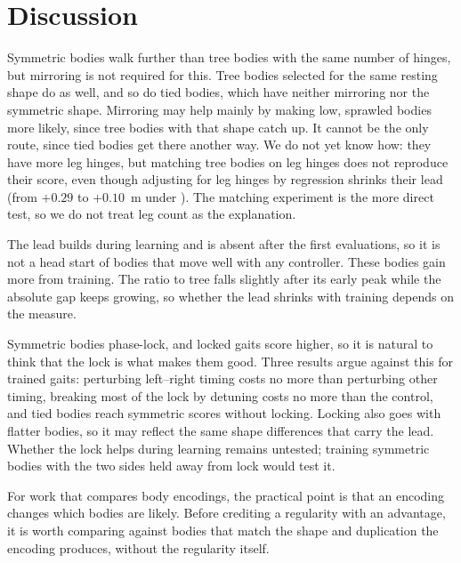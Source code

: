 \section{Discussion}
\label{sec:discussion}

Symmetric bodies walk further than tree bodies with the same number of hinges, but mirroring is not required for this. Tree bodies selected for the same resting shape do as well, and so do tied bodies, which have neither mirroring nor the symmetric shape. Mirroring may help mainly by making low, sprawled bodies more likely, since tree bodies with that shape catch up. It cannot be the only route, since tied bodies get there another way. We do not yet know how: they have more leg hinges, but matching tree bodies on leg hinges does not reproduce their score, even though adjusting for leg hinges by regression shrinks their lead (from $+0.29$ to $+0.10$~m under \bb). The matching experiment is the more direct test, so we do not treat leg count as the explanation.

The lead builds during learning and is absent after the first evaluations, so it is not a head start of bodies that move well with any controller. These bodies gain more from training. The ratio to tree falls slightly after its early peak while the absolute gap keeps growing, so whether the lead shrinks with training depends on the measure.

Symmetric bodies phase-lock, and locked gaits score higher, so it is natural to think that the lock is what makes them good. Three results argue against this for trained gaits: perturbing left--right timing costs no more than perturbing other timing, breaking most of the lock by detuning costs no more than the control, and tied bodies reach symmetric scores without locking. Locking also goes with flatter bodies, so it may reflect the same shape differences that carry the lead. Whether the lock helps during learning remains untested; training symmetric bodies with the two sides held away from lock would test it.

For work that compares body encodings, the practical point is that an encoding changes which bodies are likely. Before crediting a regularity with an advantage, it is worth comparing against bodies that match the shape and duplication the encoding produces, without the regularity itself.

